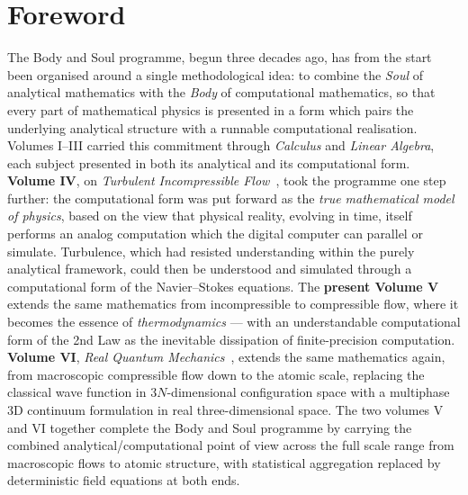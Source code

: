 
\chapter*{Foreword}


The Body and Soul programme, begun three decades ago, has from the start been
organised around a single methodological idea: to combine the \emph{Soul} of
analytical mathematics with the \emph{Body} of computational mathematics, so
that every part of mathematical physics is presented in a form which pairs the
underlying analytical structure with a runnable computational realisation.
Volumes I--III carried this commitment through \emph{Calculus} and
\emph{Linear Algebra}, each subject presented in both its analytical and its
computational form. \textbf{Volume IV}, on \emph{Turbulent Incompressible
Flow}~\cite{ambsflow}, took the programme one step further: the computational
form was put forward as the \emph{true mathematical model of physics}, based
on the view that physical reality, evolving in time, itself performs an
analog computation which the digital computer can parallel or simulate.
Turbulence, which had resisted understanding within the purely analytical
framework, could then be understood and simulated through a computational
form of the Navier--Stokes equations. The \textbf{present Volume V} extends
the same mathematics from incompressible to compressible flow, where it
becomes the essence of \emph{thermodynamics} --- with an understandable
computational form of the 2nd Law as the inevitable dissipation of
finite-precision computation. \textbf{Volume VI}, \emph{Real Quantum
Mechanics}~\cite{RealQM2026}, extends the same mathematics again, from
macroscopic compressible flow down to the atomic scale, replacing the
classical wave function in $3N$-dimensional configuration space with a
multiphase 3D continuum formulation in real three-dimensional space. The
two volumes V and VI together complete the Body and Soul programme by
carrying the combined analytical/computational point of view across the
full scale range from macroscopic flows to atomic structure, with
statistical aggregation replaced by deterministic field equations at both
ends.


